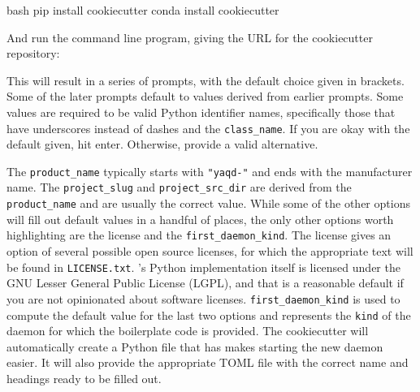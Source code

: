 \begin{codefragment}{bash}
pip install cookiecutter
conda install cookiecutter
\end{codefragment}

And run the command line program, giving the URL for the cookiecutter repository:


This will result in a series of prompts, with the default choice given in brackets.
Some of the later prompts default to values derived from earlier prompts.
Some values are required to be valid Python identifier names, specifically those that have underscores instead of dashes and the \texttt{class\_name}.
If you are okay with the default given, hit enter.
Otherwise, provide a valid alternative.

The \texttt{product\_name} typically starts with \texttt{"yaqd-"} and ends with the manufacturer name.
The \texttt{project\_slug} and \texttt{project\_src\_dir} are derived from the \texttt{product\_name} and are usually the correct value.
While some of the other options will fill out default values in a handful of places, the only other options worth highlighting are the license and the \texttt{first\_daemon\_kind}.
The license gives an option of several possible open source licenses, for which the appropriate text will be found in \texttt{LICENSE.txt}.
\yaq{}'s Python implementation itself is licensed under the GNU Lesser General Public License (LGPL), and that is a reasonable default if you are not opinionated about software licenses.
\texttt{first\_daemon\_kind} is used to compute the default value for the last two options and represents the \texttt{kind} of the daemon for which the boilerplate code is provided.
The cookiecutter will automatically create a Python file that has makes starting the new daemon easier.
It will also provide the appropriate TOML file with the correct name and headings ready to be filled out.


